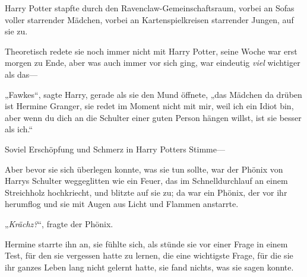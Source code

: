 Harry Potter stapfte durch den Ravenclaw-Gemeinschaftsraum, vorbei an Sofas voller starrender Mädchen, vorbei an Kartenspielkreisen starrender Jungen, auf sie zu.

Theoretisch redete sie noch immer nicht mit Harry Potter, seine Woche war erst morgen zu Ende, aber was auch immer vor sich ging, war eindeutig \emph{viel} wichtiger als das—

„Fawkes“, sagte Harry, gerade als sie den Mund öffnete, „das Mädchen da drüben ist Hermine Granger, sie redet im Moment nicht mit mir, weil ich ein Idiot bin, aber wenn du dich an die Schulter einer guten Person hängen willst, ist sie besser als ich.“

Soviel Erschöpfung und Schmerz in Harry Potters Stimme—

Aber bevor sie sich überlegen konnte, was sie tun sollte, war der Phönix von Harrys Schulter weggeglitten wie ein Feuer, das im Schnelldurchlauf an einem Streichholz hochkriecht, und blitzte auf sie zu; da war ein Phönix, der vor ihr herumflog und sie mit Augen aus Licht und Flammen anstarrte.

„\emph{Krächz?}“, fragte der Phönix.

Hermine starrte ihn an, sie fühlte sich, als stünde sie vor einer Frage in einem Test, für den sie vergessen hatte zu lernen, die eine wichtigste Frage, für die sie ihr ganzes Leben lang nicht gelernt hatte, sie fand nichts, was sie sagen konnte.

